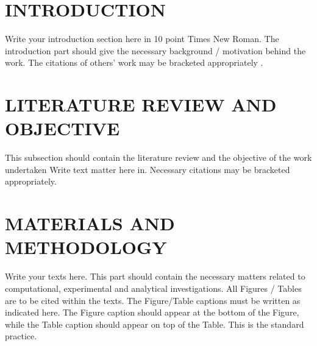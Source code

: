 \documentclass[10pt, conference]{IAES2024}
\begin{document}
\section{{\textbf{INTRODUCTION}}}

Write your introduction section here in 10 point Times New Roman. The introduction part should give the necessary background / motivation behind the work. The citations of others’ work may be bracketed  \cite{Gsell2017,Panton2009} appropriately \cite{Pascal2000}. 

\section{\textbf{LITERATURE REVIEW AND OBJECTIVE}}\label{sec2}
This subsection should contain the literature review and the objective of the work undertaken Write text matter here in. Necessary citations may be bracketed \cite{Panton2009,raj2013wettability,prasanna2020analysis,suman2015performance,Pascal2000} appropriately. 


\section{\textbf{MATERIALS AND METHODOLOGY}}
Write your texts here. This part should contain the necessary matters related to computational, experimental and analytical investigations. All Figures / Tables are to be cited within the texts. The Figure/Table captions must be written as indicated here. The Figure caption should appear at the bottom of the Figure, while the Table caption should appear on top of the Table. This is the standard practice.
\end{document}
